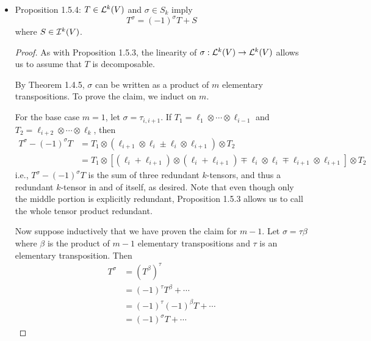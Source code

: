 \documentclass[../notes.tex]{subfiles}
\begin{document}
\begin{itemize}
\begin{proof}
\begin{equation*}
            T\otimes T' = (\ell_1\otimes\cdots\otimes\ell_i\otimes\ell_{i+1}\otimes\cdots\otimes\ell_r)\otimes(\ell_1'\otimes\cdots\otimes\ell_s')
        \end{equation*}
        is redundant and hence in $\ide[r+s]{V}$, as desired. The argument is symmetric for $T'\otimes T$.
    \end{proof}
    \item Proposition 1.5.4: $T\in\lin[k]{V}$ and $\sigma\in S_k$ imply
    \begin{equation*}
        T^\sigma = (-1)^\sigma T+S
    \end{equation*}
    where $S\in\ide[k]{V}$.
    \begin{proof}
        As with Proposition 1.5.3, the linearity of $\sigma:\lin[k]{V}\to\lin[k]{V}$ allows us to assume that $T$ is decomposable.\par
        By Theorem 1.4.5, $\sigma$ can be written as a product of $m$ elementary transpositions. To prove the claim, we induct on $m$.\par
        For the base case $m=1$, let $\sigma=\tau_{i,i+1}$. If $T_1=\ell_1\otimes\cdots\otimes\ell_{i-1}$ and $T_2=\ell_{i+2}\otimes\cdots\otimes\ell_k$, then
        \begin{align*}
            T^\sigma-(-1)^\sigma T &= T_1\otimes(\ell_{i+1}\otimes\ell_i\pm\ell_i\otimes\ell_{i+1})\otimes T_2\\
            &= T_1\otimes[(\ell_i+\ell_{i+1})\otimes(\ell_i+\ell_{i+1})\mp\ell_i\otimes\ell_i\mp\ell_{i+1}\otimes\ell_{i+1}]\otimes T_2
        \end{align*}
        i.e., $T^\sigma-(-1)^\sigma T$ is the sum of three redundant $k$-tensors, and thus a redundant $k$-tensor in and of itself, as desired. Note that even though only the middle portion is explicitly redundant, Proposition 1.5.3 allows us to call the whole tensor product redundant.\par
        Now suppose inductively that we have proven the claim for $m-1$. Let $\sigma=\tau\beta$ where $\beta$ is the product of $m-1$ elementary transpositions and $\tau$ is an elementary transposition. Then
        \begin{align*}
            T^\sigma &= (T^\beta)^\tau\tag*{Proposition 1.4.14(3)}\\
            &= (-1)^\tau T^\beta+\cdots\tag*{Base case}\\
            &= (-1)^\tau(-1)^\beta T+\cdots\tag*{Inductive hypothesis}\\
            &= (-1)^\sigma T+\cdots\tag*{Claim 1.4.9}

\end{align*}
\end{proof}
\end{itemize}
\end{document}
